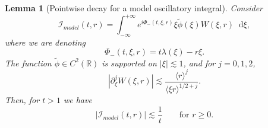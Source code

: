 \documentclass[11 pt]{amsart}
\newtheorem{lem}{Lemma}[section]
\theoremstyle{definition}
\theoremstyle{remark}
\numberwithin{equation}{section}
\newcommand{\dd}{\mathop{}\!\mathrm{d}}
\begin{document}
\begin{lem}[Pointwise decay for a model oscillatory integral] 
\label{lempointwisedecay} Consider
$$
\mathcal I_{model}(t,r) = \int_{-\infty}^{+\infty} e^{i \Phi_{-}(t,\xi,r)} \xi \widetilde{\phi}(\xi) W (\xi,r) \dd \xi,
$$
where we are denoting
$$
\Phi_{-}(t,\xi,r) = t \lambda(\xi) - r \xi.
$$
The function $\widetilde \phi \in C^2(\mathbb R)$ is supported on $|\xi| \lesssim 1$, and for $j=0,1,2$,
\begin{equation}
\label{estimateWa2-lem}
| \partial_{\xi}^j W (\xi,r)  | \lesssim \frac{\langle r \rangle^j}{\langle \xi r \rangle^{1/2+j}}.
\end{equation}
Then, for $t>1$ we have
\begin{equation} \label{dispersive1-lem}
|\mathcal I_{model}(t,r)|\lesssim \frac{1}{t} \qquad \mbox{for }r\geq 0.
\end{equation}
\end{lem}
\end{document}
